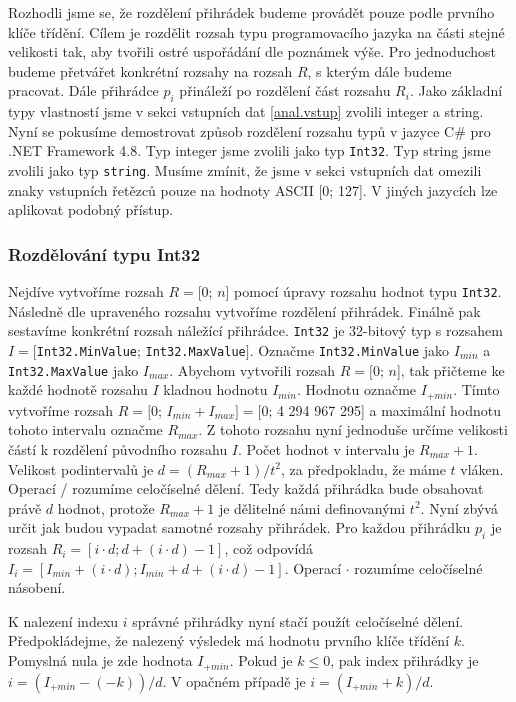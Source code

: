 Rozhodli jsme se, že rozdělení přihrádek budeme provádět pouze podle prvního klíče třídění.
Cílem je rozdělit rozsah typu programovacího jazyka na části stejné velikosti tak, aby tvořili ostré uspořádání dle poznámek výše.
Pro jednoduchost budeme přetvářet konkrétní rozsahy na rozsah $R$, s kterým dále budeme pracovat.
Dále přihrádce $p_i$ přináleží po rozdělení část rozsahu $R_i$.
Jako základní typy vlastností jsme v sekci vstupních dat \ref{anal.vstup} zvolili integer a string. 
Nyní se pokusíme demostrovat způsob rozdělení rozsahu typů v jazyce C\# pro .NET Framework 4.8.
Typ integer jsme zvolili jako typ \texttt{Int32}.
Typ string jsme zvolili jako typ \texttt{string}.
Musíme zmínit, že jsme v sekci vstupních dat omezili znaky vstupních řetězců pouze na hodnoty ASCII [0; 127]. 
V jiných jazycích lze aplikovat podobný přístup.

\subsubsection{Rozdělování typu Int32}

Nejdíve vytvoříme rozsah $R=[$0; $n$] pomocí úpravy rozsahu hodnot typu \texttt{Int32}.
Následně dle upraveného rozsahu vytvoříme rozdělení přihrádek.
Finálně pak sestavíme konkrétní rozsah náležící přihrádce.
\texttt{Int32} je 32-bitový typ s rozsahem $I=[$\texttt{Int32.MinValue}; \texttt{Int32.MaxValue}$]$.
Označme \texttt{Int32.MinValue} jako $I_{min}$ a \texttt{Int32.MaxValue} jako $I_{max}$.
Abychom vytvořili rozsah $R=[$0; $n$], tak přičteme ke každé hodnotě rozsahu $I$ kladnou hodnotu $I_{min}$.
Hodnotu označme $I_{+min}$.
Tímto vytvoříme rozsah $R=[0$; $I_{min}+I_{max}$$]=[0$; 4 294 967 295] a maximální hodnotu tohoto intervalu označme $R_{max}$.
Z tohoto rozsahu nyní jednoduše určíme velikosti částí k rozdělení původního rozsahu $I$.
Počet hodnot v intervalu je $R_{max}+1$.
Velikost podintervalů je $d=(R_{max}+1)/t^2$, za předpokladu, že máme $t$ vláken.
Operací / rozumíme celočíselné dělení. 
Tedy každá přihrádka bude obsahovat právě $d$ hodnot, protože $R_{max}+1$ je dělitelné námi definovanými $t^2$.
Nyní zbývá určit jak budou vypadat samotné rozsahy přihrádek.
Pro každou přihrádku $p_i$ je rozsah $R_i=[i \cdot d; d+(i \cdot d)-1]$, což odpovídá $I_i=[I_{min}+(i \cdot d); I_{min}+d+(i \cdot d)-1]$.
Operací $\cdot$ rozumíme celočíselné násobení.

K nalezení indexu $i$ správné přihrádky nyní stačí použít celočíselné dělení.
Předpokládejme, že nalezený výsledek má hodnotu prvního klíče třídění $k$.
Pomyslná nula je zde hodnota $I_{+min}$.
Pokud je $k \leq 0$, pak index přihrádky je $i=(I_{+min}-(-k))/d$.
V opačném případě je $i=(I_{+min}+k)/d$.

